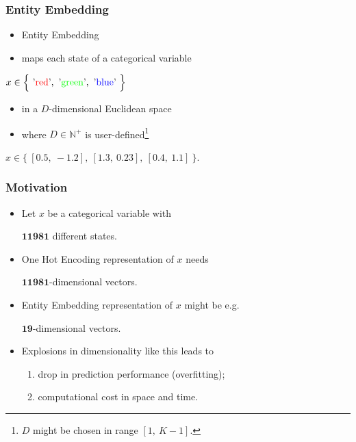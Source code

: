 \documentclass{beamer}
\begin{document}
\begin{frame}
\frametitle{Entity Embedding}
    \begin{itemize}
        \item Entity Embedding
        \item maps each state of a categorical variable
    \end{itemize}
    \begin{center}
        $x \in \Big\{\ \text{'\textcolor{red}{red}'},\ \text{'\textcolor{green}{green}'},\ \text{'\textcolor{blue}{blue}'}\ \Big\}$
    \end{center}
    \begin{itemize}
        \item in a $D$-dimensional Euclidean space
        \item where $D \in \mathbb{N}^+$ is user-defined\footnote{$D$ might be chosen in range $[1,\ K - 1]$.}
    \end{itemize}
    \begin{center}
        $x \in \Big\{\ [0.5,\ -1.2],\ [1.3,\ 0.23],\ [0.4,\ 1.1]\ \Big\}$.
    \end{center}
\end{frame}
\begin{frame}
    \frametitle{Motivation}
    \begin{itemize}
        \item Let $x$ be a categorical variable with
            \begin{center}
                $\mathbf{11981}$ different states.
            \end{center}
    \end{itemize}
    \begin{itemize}
        \item One Hot Encoding representation of $x$ needs
            \begin{center}
                $\mathbf{11981}$-dimensional vectors.
            \end{center}
    \end{itemize}
    \begin{itemize}
        \item Entity Embedding representation of $x$ might be e.g.
            \begin{center}
                $\mathbf{19}$-dimensional vectors.
            \end{center}
    \end{itemize}
\medskip
    \begin{itemize}
        \item Explosions in dimensionality like this leads to
            \begin{enumerate}
                \item drop in prediction performance (overfitting);
                \item computational cost in space and time.
            \end{enumerate}
    \end{itemize}
\end{frame}
\end{document}
